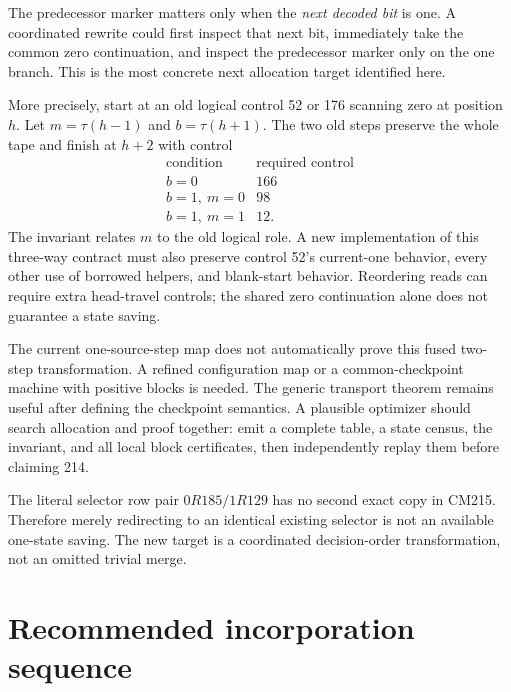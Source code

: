 \documentclass[11pt]{article}
\begin{document}
The predecessor marker matters only when the \emph{next decoded bit} is one. A coordinated rewrite could first inspect that next bit, immediately take the common zero continuation, and inspect the predecessor marker only on the one branch. This is the most concrete next allocation target identified here.

More precisely, start at an old logical control 52 or 176 scanning zero at position $h$. Let $m=\tau(h-1)$ and $b=\tau(h+1)$. The two old steps preserve the whole tape and finish at $h+2$ with control
\[
\begin{array}{c|c}
\text{condition}&\text{required control}\\\hline
b=0&166\\
b=1,\ m=0&98\\
b=1,\ m=1&12.
\end{array}
\]
The invariant relates $m$ to the old logical role. A new implementation of this three-way contract must also preserve control 52's current-one behavior, every other use of borrowed helpers, and blank-start behavior. Reordering reads can require extra head-travel controls; the shared zero continuation alone does not guarantee a state saving.

The current one-source-step map does not automatically prove this fused two-step transformation. A refined configuration map or a common-checkpoint machine with positive blocks is needed. The generic transport theorem remains useful after defining the checkpoint semantics. A plausible optimizer should search allocation and proof together: emit a complete table, a state census, the invariant, and all local block certificates, then independently replay them before claiming 214.

The literal selector row pair $0R185/1R129$ has no second exact copy in CM215. Therefore merely redirecting to an identical existing selector is not an available one-state saving. The new target is a coordinated decision-order transformation, not an omitted trivial merge.

\section{Recommended incorporation sequence}
\end{document}
